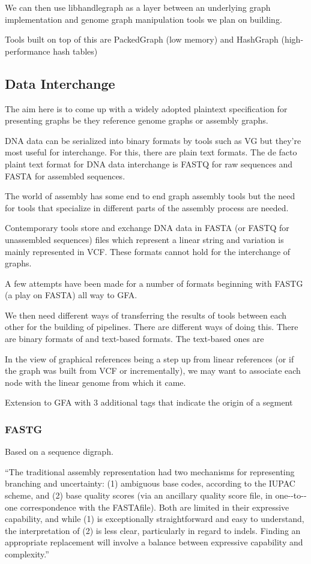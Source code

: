 \documentclass[11pt]{article}
\begin{document}
We can then use libhandlegraph as a layer between an underlying graph implementation and genome graph manipulation tools we plan on building.

Tools built on top of this are PackedGraph (low memory) and HashGraph (high-performance hash tables)

\subsection{Data Interchange}
\label{sec:org704c9f8}
The aim here is to come up with a widely adopted plaintext specification for presenting graphs be they reference genome graphs or assembly graphs.

DNA data can be serialized into binary formats by tools such as VG but they’re most useful for interchange. For this, there are plain text formats. The de facto plaint text format for DNA data interchange is FASTQ for raw sequences and FASTA for assembled sequences.

The world of assembly has some end to end graph assembly tools but the need for tools that specialize in different parts of the assembly process are needed.

Contemporary tools store and exchange DNA data in FASTA (or FASTQ for unassembled sequences) files which represent a linear string and variation is mainly represented in VCF. These formats cannot hold for the interchange of graphs. 

A few attempts have been made for a number of formats beginning with FASTG (a play on FASTA) all way to GFA.

We then need different ways of transferring the results of tools between each other for the building of pipelines. 
There are different ways of doing this. There are binary formats of and text-based formats. The text-based ones are 

In the view of graphical references being a step up from linear references (or if the graph was built from VCF or incrementally), we may want to associate each node with the linear genome from which it came.

Extension to GFA with 3 additional tags that indicate the origin of a segment

\subsubsection{FASTG}
\label{sec:orge3d470a}
Based on a sequence digraph.

“The traditional assembly representation had two mechanisms for representing branching and uncertainty:    (1)    ambiguous base codes,    according to the    IUPAC    scheme,    and    (2)    base quality scores    (via an ancillary quality score file,    in    one-­‐to-­‐one    correspondence with the    FASTAfile).    Both are limited in their expressive capability,    and while    (1)    is exceptionally straightforward and easy to understand,    the interpretation of    (2)    is less clear,    particularly in regard to indels.    Finding an appropriate replacement will involve a    balance between expressive capability and complexity.”
\end{document}
